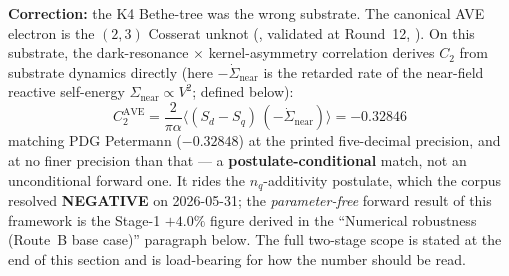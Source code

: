 \noindent\textbf{Correction:} the K4 Bethe-tree was the wrong substrate. The canonical AVE electron is the $(2,3)$ Cosserat unknot (, validated at Round~12, ). On this substrate, the dark-resonance $\times$ kernel-asymmetry correlation derives $C_2$ from substrate dynamics directly (here $-\dot{\Sigma}_{\text{near}}$ is the retarded rate of the near-field reactive self-energy $\Sigma_{\text{near}} \propto V^2$; defined below):
\begin{equation*}
C_2^{\text{AVE}} = \frac{2}{\pi\alpha}\langle (S_d - S_q)\,(-\dot{\Sigma}_{\text{near}})\rangle = -0.32846
\end{equation*}
matching PDG Petermann ($-0.32848$) at the printed five-decimal precision, and at
no finer precision than that --- a
\textbf{postulate-conditional} match, not an unconditional forward one. It rides the
$n_q$-additivity postulate, which the corpus resolved \textbf{NEGATIVE} on 2026-05-31; the
\emph{parameter-free} forward result of this framework is the Stage-1 $+4.0\%$ figure derived in
the ``Numerical robustness (Route~B base case)'' paragraph below. The full two-stage scope is stated at the end of this
section and is load-bearing for how the number should be read.

